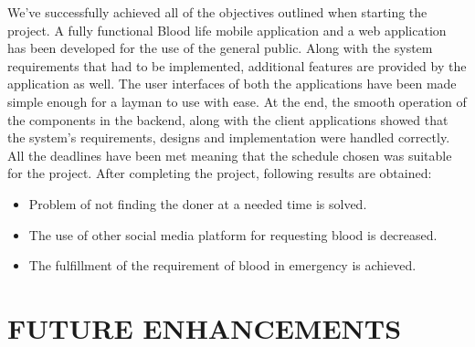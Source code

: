 
We've successfully achieved all of the objectives outlined when starting the project. A fully functional Blood life mobile application and a web application has been developed for the use of the general public. Along with the system requirements that had to be implemented, additional features are provided by the application as well. The user interfaces of both the applications have been made simple enough for a layman to use with ease. At the end, the smooth operation of the components in the backend, along with the client applications showed that the system's requirements, designs and implementation were handled correctly. All the deadlines have been met meaning that the schedule chosen was suitable for the project. After completing the project, following results are obtained: 
\begin{itemize}[itemsep=-4pt, topsep=-8pt]
    \item Problem of not finding the doner at a needed time is solved.
    \item The use of other social media platform for requesting blood is decreased.
    \item The fulfillment of the requirement of blood in emergency is achieved.
\end{itemize}

\section{FUTURE ENHANCEMENTS}




